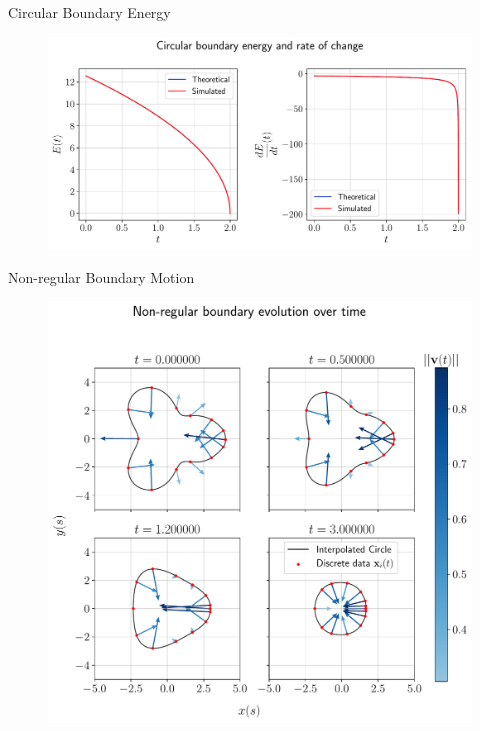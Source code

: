 \documentclass[usenames,dvipsnames]{beamer}
\begin{document}
\begin{frame}{Circular Boundary Energy}
     \begin{figure}
        \centering
        \includegraphics[trim={0 0 0 0}, clip=true, scale=0.43]{figures/closed_boundary/circularboundary_energy.pdf}
    \end{figure}  
\end{frame}

\begin{frame}{Non-regular Boundary Motion}
     \begin{figure}
        \centering
        \includegraphics[trim={0 0 0 6em}, clip=true, scale=0.43]{figures/closed_boundary/nonregularboundary.pdf}
    \end{figure}  
\end{frame}
\end{document}
